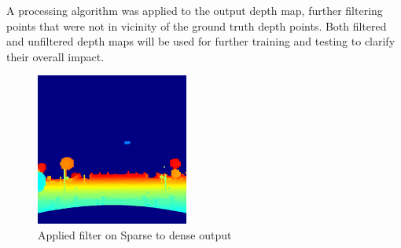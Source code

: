 \documentclass[twoside]{ctuthesis}
\theoremstyle{plain}
\theoremstyle{definition}
\theoremstyle{note}
\begin{document}
A processing algorithm was applied to the output depth map, further filtering points that were not in vicinity of the ground truth depth points. Both filtered and unfiltered depth maps will be used for further training and testing to clarify their overall impact.
\begin{figure}[h!]
	\centering
	\includegraphics[width=5cm]{sparse2dense_filter.png}
	\caption{Applied filter on Sparse to dense output}
\end{figure}
\end{document}
